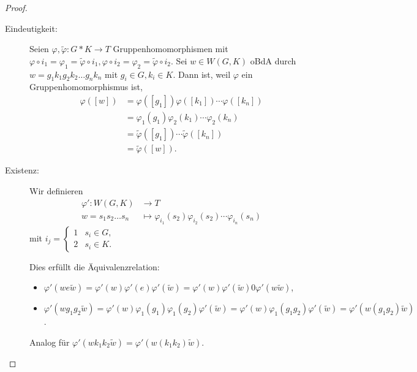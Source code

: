 \documentclass[language=ngerman]{TemplateLecture} %
\begin{document}
\begin{proof}
    \begin{description}
        \item[Eindeutigkeit:] Seien $\varphi, \tilde{\varphi}: G * K \to T$ Gruppenhomomorphismen mit $\varphi \circ i_1 = \varphi_1 = \tilde{\varphi} \circ i_1, \varphi \circ i_2 = \varphi_2 = \tilde{\varphi} \circ i_2$. Sei $w \in W(G,K)$ oBdA durch $w = g_1 k_1 g_2 k_2 \ldots g_n k_n$ mit $g_i \in G, k_i \in K$. Dann ist, weil $\varphi$ ein Gruppenhomomorphismus ist,
        \begin{equation*}
            \begin{split}
                \varphi([w]) &= \varphi([g_1]) \varphi([k_1]) \cdots \varphi([k_n]) \\
                &= \varphi_1(g_1) \varphi_2(k_1) \cdots \varphi_2(k_n) \\
                &= \tilde{\varphi}([g_1]) \cdots \tilde{\varphi}([k_n]) \\
                &= \tilde{\varphi}([w]).
            \end{split}
        \end{equation*}
        \item[Existenz:] Wir definieren
        \begin{equation*}
            \begin{split}
                \varphi': W(G,K) &\longrightarrow T \\
                w = s_1 s_2 \ldots s_n &\longmapsto \varphi_{i_1}(s_2) \varphi_{i_2}(s_2) \cdots \varphi_{i_n}(s_n)
            \end{split}
        \end{equation*}
        mit $i_j = \begin{cases}
            1 & s_i \in G, \\ 2 & s_i \in K.
        \end{cases}$

        Dies erfüllt die Äquivalenzrelation:
        \begin{itemize}
            \item $\varphi'(w e \tilde{w}) = \varphi'(w) \varphi'(e) \varphi'(\tilde{w}) = \varphi'(w) \varphi'(\tilde{w}) 0 \varphi'(w \tilde{w})$,
            \item $\varphi'(w g_1 g_2 \tilde{w}) = \varphi'(w) \varphi_1(g_1) \varphi_1(g_2) \varphi'(\tilde{w}) = \varphi'(w) \varphi_1(g_1 g_2) \varphi'(\tilde{w}) = \varphi'(w (g_1 g_2) \tilde{w})$.
        \end{itemize}
        Analog für $\varphi'(w k_1 k_2 \tilde{w}) = \varphi'(w (k_1 k_2) \tilde{w})$.


\end{description}
\end{proof}
\end{document}
